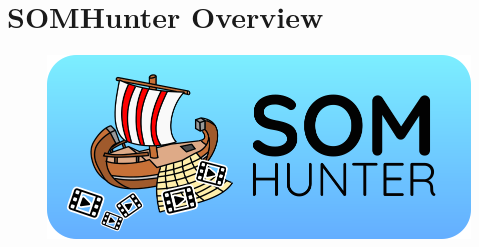 \chapter{SOMHunter Overview}
\label{overview}


\begin{figure}
	\centering
	\includegraphics[width=\textwidth]{img/somhunter-logo.png}
	\label{fig:logo}
\end{figure}
